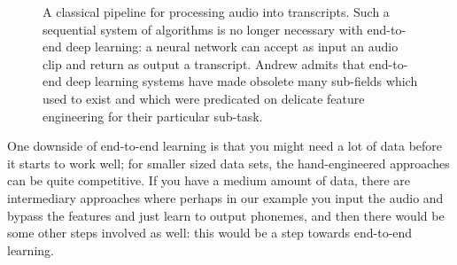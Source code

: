 \documentclass[12pt]{article}
\begin{document}
\begin{figure}[h]   \centering
  \caption{\footnotesize A classical pipeline for processing audio into transcripts. Such a sequential system of algorithms is no longer necessary with end-to-end deep learning: a neural network can accept as input an audio clip and return as output a transcript. Andrew admits that end-to-end deep learning systems have made obsolete many sub-fields which used to exist and which were predicated on delicate feature engineering for their particular sub-task.} \end{figure}

One downside of end-to-end learning is that you might need a lot of data before it starts to work well; for smaller sized data sets,
the hand-engineered approaches can be quite competitive. If you have a medium amount of data, there are intermediary approaches
where perhaps in our example you input the audio and bypass the features and just learn to output phonemes, and then there would be some other steps involved as well: this would be a step towards end-to-end learning.
\end{document}
